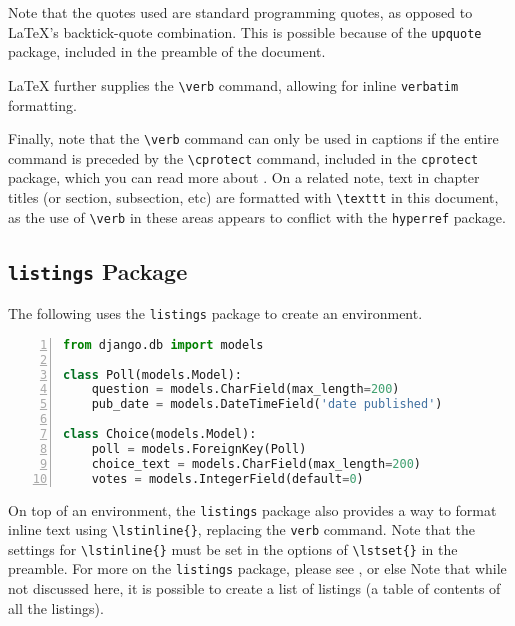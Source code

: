 Note that the quotes used are standard programming quotes, as opposed to \LaTeX 's backtick-quote combination. This is possible because of the \verb|upquote| package, included in the preamble of the document.

\LaTeX{} further supplies the \verb|\verb| command, allowing for inline \verb|verbatim| formatting.

Finally, note that the \verb|\verb| command can only be used in captions if the entire command is preceded by the \verb|\cprotect| command, included in the \verb|cprotect| package, which you can read more about . On a related note, text in chapter titles (or section, subsection, etc) are formatted with \verb|\texttt| in this document, as the use of \verb|\verb| in these areas appears to conflict with the \verb|hyperref| package.

\subsection{\texttt{listings} Package}

The following uses the \verb|listings| package to create an environment.

\noindent\minipage{\linewidth} %
\begin{lstlisting}[aboveskip=\baselineskip,%
                   basicstyle=\ttfamily,%
                   belowskip=\baselineskip,%
                   caption={\lstinline{models.py} from Django Tutorial},%
                   columns=fixed,%
                   firstnumber=1,%
                   frame=single,%
                   label=code:django:models_basic_listing,%
                   language=Python,%
                   numbers=left,%
                   showstringspaces=false,%
                   showspaces=false]
from django.db import models

class Poll(models.Model):
    question = models.CharField(max_length=200)
    pub_date = models.DateTimeField('date published')

class Choice(models.Model):
    poll = models.ForeignKey(Poll)
    choice_text = models.CharField(max_length=200)
    votes = models.IntegerField(default=0)
\end{lstlisting}
\endminipage %

On top of an environment, the \lstinline{listings} package also provides a way to format inline text using \lstinline|\lstinline{}|, replacing the \lstinline{verb} command. Note that the settings for \lstinline|\lstinline{}| must be set in the options of \lstinline|\lstset{}| in the preamble. For more on the \lstinline{listings} package, please see , or else 
Note that while not discussed here, it is possible to create a list of listings (a table of contents of all the listings).

